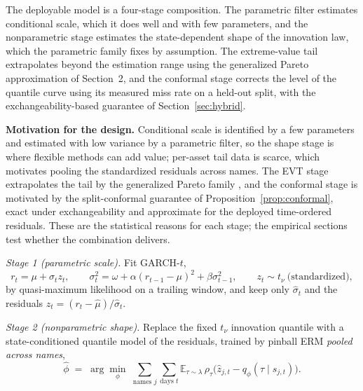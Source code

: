 \documentclass[11pt]{article}
\theoremstyle{remark}
\begin{document}
The deployable model is a four-stage composition. The parametric
filter estimates conditional scale, which it does well and with few
parameters, and the nonparametric stage estimates the state-dependent
shape of the innovation law, which the parametric family fixes by
assumption. The extreme-value tail extrapolates beyond the estimation
range using the generalized Pareto approximation of Section~2, and the
conformal stage corrects the level of the quantile curve using its
measured miss rate on a held-out split, with the exchangeability-based
guarantee of Section~\ref{sec:hybrid}.

\noindent\textbf{Motivation for the design.} Conditional scale is
identified by a few parameters and estimated with low variance by a
parametric filter, so the shape stage is where flexible methods can
add value; per-asset tail data is scarce, which motivates pooling the
standardized residuals across names. The EVT stage extrapolates the
tail by the generalized Pareto family \citep{balkema1974,
pickands1975}, and the conformal stage is motivated by the
split-conformal guarantee of Proposition~\ref{prop:conformal}, exact
under exchangeability and approximate for the deployed time-ordered
residuals. These are the
statistical reasons for each stage; the empirical sections test
whether the combination delivers.

\emph{Stage 1 (parametric scale).} Fit GARCH-$t$,
\begin{equation}
r_t = \mu + \sigma_t z_t,\qquad
\sigma_t^2 = \omega + \alpha (r_{t-1}-\mu)^2 + \beta \sigma_{t-1}^2,
\qquad z_t \sim t_\nu \ \text{(standardized)},
\label{eq:garch}
\end{equation}
by quasi-maximum likelihood on a trailing window, and keep only
$\widehat{\sigma}_t$ and the residuals
$\widehat{z}_t = (r_t-\widehat{\mu})/\widehat{\sigma}_t$.

\emph{Stage 2 (nonparametric shape).} Replace the fixed $t_\nu$
innovation quantile with a state-conditioned quantile model of the
residuals, trained by pinball ERM \emph{pooled across names},
\begin{equation}
\widehat{\phi} \;=\; \arg\min_{\phi}\;
\sum_{\text{names } j}\sum_{\text{days } t}
\mathbb{E}_{\tau\sim\lambda}\,
\rho_\tau\!\big(\widehat{z}_{j,t} - q_\phi(\tau \mid s_{j,t})\big).
\label{eq:shapeERM}
\end{equation}
\end{document}
